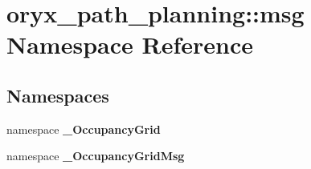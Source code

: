 \section{oryx\-\_\-path\-\_\-planning\-:\-:msg \-Namespace \-Reference}
\label{namespaceoryx__path__planning_1_1msg}
\subsection*{\-Namespaces}
\begin{DoxyCompactItemize}
\item 
namespace {\bf \-\_\-\-Occupancy\-Grid}
\item 
namespace {\bf \-\_\-\-Occupancy\-Grid\-Msg}
\end{DoxyCompactItemize}
